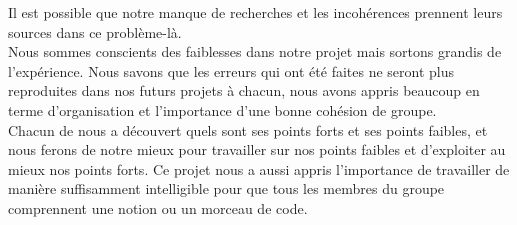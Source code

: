 \documentclass[a4paper,11pt]{article}
\begin{document}
 		Il est possible que notre manque de recherches et les incohérences prennent leurs sources dans ce problème-là.\\
		Nous sommes conscients des faiblesses dans notre projet mais sortons grandis de l’expérience. Nous savons que les erreurs qui ont été faites ne seront plus reproduites dans nos futurs projets à chacun, nous avons appris beaucoup en terme d’organisation et l’importance d’une bonne cohésion de groupe.\\ 
		Chacun de nous a découvert quels sont ses points forts et ses points faibles, et nous ferons de notre mieux pour travailler sur nos points faibles et d’exploiter au mieux nos points forts. Ce projet nous a aussi appris l’importance de travailler de manière suffisamment intelligible pour que tous les membres du groupe comprennent une notion ou un morceau de code.\\
\end{document}
